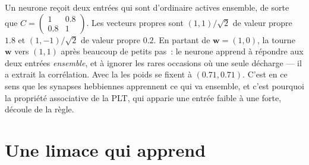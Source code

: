 \begin{example}\label{ex:b3:learning-memory:two-inputs}
Un neurone reçoit deux entrées qui sont d'ordinaire actives ensemble, de
sorte que $C =
\begin{pmatrix} 1 & 0.8 \\ 0.8 & 1\end{pmatrix}$. Les vecteurs propres
sont $(1,1)/\sqrt{2}$ de valeur propre $1.8$ et $(1,-1)/\sqrt{2}$ de
valeur propre $0.2$. En partant de $\mathbf{w} = (1, 0)$, la  tourne $\mathbf{w}$ vers $(1,1)$ après beaucoup de petits pas~: le
neurone apprend à répondre aux deux entrées \emph{ensemble}, et à
ignorer les rares occasions où une seule décharge --- il a extrait la
corrélation. Avec la  les poids se fixent à $(0.71, 0.71)$.
C'est en ce sens que les synapses hebbiennes apprennent ce qui va
ensemble, et c'est pourquoi la propriété associative de la PLT, qui
apparie une entrée faible à une forte, découle de la règle.
\end{example}

\section{Une limace qui apprend}

